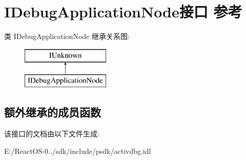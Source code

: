 \hypertarget{interface_i_debug_application_node}{}\section{I\+Debug\+Application\+Node接口 参考}
\label{interface_i_debug_application_node}
类 I\+Debug\+Application\+Node 继承关系图\+:\begin{figure}[H]
\begin{center}
\leavevmode
\includegraphics[height=2.000000cm]{interface_i_debug_application_node}
\end{center}
\end{figure}
\subsection*{额外继承的成员函数}


该接口的文档由以下文件生成\+:\begin{DoxyCompactItemize}
\item 
E\+:/\+React\+O\+S-\/0../sdk/include/psdk/activdbg.\+idl\end{DoxyCompactItemize}
